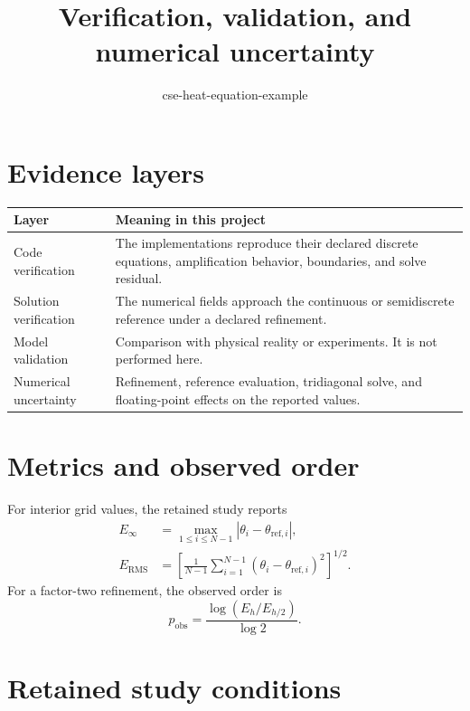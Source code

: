 \documentclass[11pt]{article}
\begin{document}
\title{Verification, validation, and numerical uncertainty}
\author{cse-heat-equation-example}
\date{}
\maketitle

\section{Evidence layers}

\begin{center}
\begin{tabular}{@{}>{\raggedright\arraybackslash}p{}p{}@{}}
\toprule
Layer & Meaning in this project\\
\midrule
Code verification & The implementations reproduce their declared discrete
equations, amplification behavior, boundaries, and solve residual.\\
Solution verification & The numerical fields approach the continuous or
semidiscrete reference under a declared refinement.\\
Model validation & Comparison with physical reality or experiments. It is not
performed here.\\
Numerical uncertainty & Refinement, reference evaluation, tridiagonal solve,
and floating-point effects on the reported values.\\
\bottomrule
\end{tabular}
\end{center}

\section{Metrics and observed order}

For interior grid values, the retained study reports
\begin{align}
  E_{\infty}
  &=\max_{1\leq i\leq N-1}
    |\theta_i-\theta_{\mathrm{ref},i}|,\\
  E_{\mathrm{RMS}}
  &=\left[\frac{1}{N-1}\sum_{i=1}^{N-1}
    (\theta_i-\theta_{\mathrm{ref},i})^2\right]^{1/2}.
\end{align}
For a factor-two refinement, the observed order is
\begin{equation}
  p_{\mathrm{obs}}=\frac{\log(E_h/E_{h/2})}{\log 2}.
\end{equation}

\section{Retained study conditions}
\end{document}
